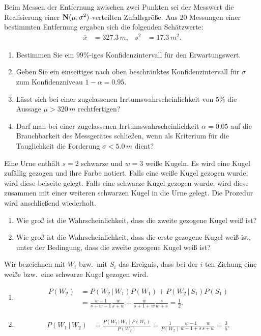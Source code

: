  Beim Messen der
Entfernung zwischen zwei Punkten sei der Messwert die Realisierung einer
$\mathbf N(\mu, \sigma^2)$-verteilten Zufallsgröße. Aus $20$ Messungen einer
bestimmten Entfernung ergaben sich die folgenden Schätzwerte:
\begin{align*}
    \bar x &= 327.3\,m, & s^2 &= 17.3\,m^2.
\end{align*}
\begin{enumerate}
    \item Bestimmen Sie ein $99\%$-iges Konfidenzintervall für den
        Erwartungswert.

    \item Geben Sie ein einseitiges nach oben beschränktes Konfidenzintervall
        für $\sigma$ zum Konfidenzniveau $1-\alpha= 0.95$. 

    \item Lässt sich bei einer zugelassenen Irrtumswahrscheinlichkeit von $5\%$
        die Aussage $\mu > 320\,m$ rechtfertigen?

    \item Darf man bei einer zugelassenen Irrtumswahrscheinlichkeit
        $\alpha=0.05$ auf die Brauchbarkeit des Messgerätes schließen, wenn als
        Kriterium für die Tauglichkeit die Forderung $\sigma < 5.0\,m $ dient?
\end{enumerate}

 Eine Urne enthält $s=2$ schwarze und
$w=3$ weiße Kugeln. Es wird eine Kugel zufällig gezogen und ihre Farbe notiert.
Falls eine weiße Kugel gezogen wurde, wird diese beiseite gelegt. Falls eine
schwarze Kugel gezogen wurde, wird diese zusammen mit einer weiteren schwarzen
Kugel in die Urne gelegt. Die Prozedur wird anschließend wiederholt.
\begin{enumerate}
    \item Wie groß ist die Wahrscheinlichkeit, dass die zweite gezogene Kugel
        weiß ist?
    \item Wie groß ist die Wahrscheinlichkeit, dass die erste gezogene Kugel
        weiß ist, unter der Bedingung, dass die zweite gezogene Kugel weiß ist?
\end{enumerate}

\solution
Wir bezeichnen mit $W_i$ bzw.\ mit $S_i$ das Ereignis, dass bei der $i$-ten
Ziehung eine weiße bzw.\ eine schwarze Kugel gezogen wird.
\begin{enumerate}
    \item \begin{align*}
            P(W_2) &= P(W_2 \,|\, W_1)P(W_1) + P(W_2 \,|\, S_1)P(S_1) \\
            &= \frac{w-1}{s+w-1} \frac{w}{s+w} + \frac{w}{s+1+w} \frac{s}{w+s} = \frac{1}{2}. 
        \end{align*}
    \item \begin{align*}
            P( W_1 \,|\, W_2 ) &= \frac{P(W_2 \,|\, W_1) P(W_1)}{P(W_2)} = 
            \frac{1}{P(W_2)} \frac{ w-1 }{w-1+s}\frac{w}{s+w} = \frac{3}{5}. 
        \end{align*}
\end{enumerate}




